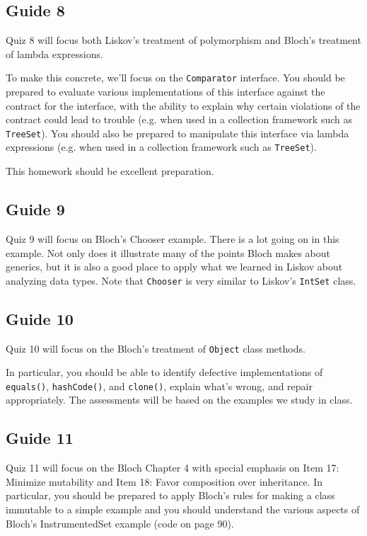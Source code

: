 \documentclass[11pt]{article}
\begin{document}
\subsection{Guide 8}
\label{sec:org3b1a2ca}
Quiz 8 will focus both Liskov's treatment of polymorphism and Bloch's treatment of lambda expressions.

To make this concrete, we'll focus on the \texttt{Comparator} interface. You should be prepared to evaluate various implementations of this interface against the contract for the interface, with the ability to explain why certain violations of the contract could lead to trouble (e.g. when used in a collection framework such as \texttt{TreeSet}). You should also be prepared to manipulate this interface via lambda expressions (e.g. when used in a collection framework such as \texttt{TreeSet}).

This homework should be excellent preparation.


\subsection{Guide 9}
\label{sec:org28a3f01}
Quiz 9 will focus on Bloch's Chooser example. There is a lot going on in this example. Not only does it illustrate many of the points Bloch makes about generics, but it is also a good place to apply what we learned in Liskov about analyzing data types. Note that \texttt{Chooser} is very similar to Liskov's \texttt{IntSet} class.

\subsection{Guide 10}
\label{sec:orgcc316de}
Quiz 10 will focus on the Bloch's treatment of \texttt{Object} class methods.

In particular, you should be able to identify defective implementations of \texttt{equals()}, \texttt{hashCode()}, and \texttt{clone()}, explain what's wrong, and repair appropriately. The assessments will be based on the examples we study in class.

\subsection{Guide 11}
\label{sec:orgb293768}
Quiz 11 will focus on the Bloch Chapter 4 with special emphasis on Item 17: Minimize mutability and Item 18: Favor composition over inheritance. In particular, you should be prepared to apply Bloch's rules for making a class immutable to a simple example and you should understand the various aspects of Bloch's InstrumentedSet example (code on page 90).
\end{document}
